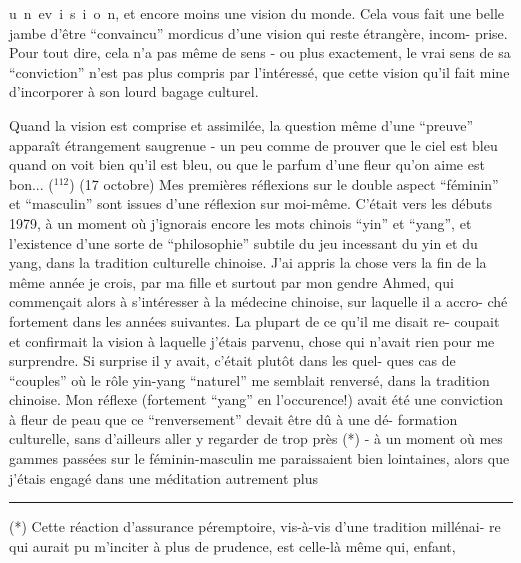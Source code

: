 \mbox{u n e}\quad\mbox{v i s i o n}, et encore moins une vision du monde. Cela vous fait une
belle jambe d'être ``convaincu'' mordicus d'une vision qui reste étrangère, incom-
prise. Pour tout dire, cela n'a pas même de sens - ou plus exactement, le vrai
sens de sa ``conviction'' n'est pas plus compris par l'intéressé, que cette vision
qu'il fait mine d'incorporer à son lourd bagage culturel.

Quand la vision est comprise et assimilée, la question même d'une ``preuve''
apparaît étrangement saugrenue - un peu comme de prouver que le ciel est bleu
quand on voit bien qu'il est bleu, ou que le parfum d'une fleur qu'on aime est
bon...
($^{112}$) (17 octobre) Mes premières réflexions sur le double aspect ``féminin'' et
``masculin'' sont issues d'une réflexion sur moi-même. C'était vers les débuts
1979, à un moment où j'ignorais encore les mots chinois ``yin'' et ``yang'', et
l'existence d'une sorte de ``philosophie'' subtile du jeu incessant du yin et
du yang, dans la tradition culturelle chinoise. J'ai appris la chose vers la
fin de la même année je crois, par ma fille et surtout par mon gendre Ahmed, qui
commençait alors à s'intéresser à la médecine chinoise, sur laquelle il a accro-
ché fortement dans les années suivantes. La plupart de ce qu'il me disait re-
coupait et confirmait la vision à laquelle j'étais parvenu, chose qui n'avait
rien pour me surprendre. Si surprise il y avait, c'était plutôt dans les quel-
ques cas de ``couples'' où le rôle yin-yang ``naturel'' me semblait renversé, dans
la tradition chinoise. Mon réflexe (fortement ``yang'' en l'occurence!) avait été
une conviction à fleur de peau que ce ``renversement'' devait être dû à une dé-
formation culturelle, sans d'ailleurs aller y regarder de trop près (*) - 
à un moment où mes gammes passées sur le féminin-masculin me paraissaient bien
lointaines, alors que j'étais engagé dans une méditation autrement plus 
\par\noindent\rule{0.24\linewidth}{0.4pt}\par
(*) Cette réaction d'assurance péremptoire, vis-à-vis d'une tradition millénai-
re qui aurait pu m'inciter à plus de prudence, est celle-là même qui, enfant,
